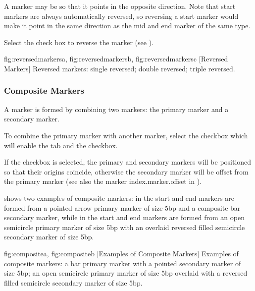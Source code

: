 A marker may be  so that it
points in the opposite direction. Note that start markers are always 
automatically reversed, so reversing a start marker would make it
point in the same direction as the mid and end marker of the same
type.


Select the  check box to reverse the marker
(see ).

{
  {fig:reversedmarkersa}{}{},
  {fig:reversedmarkersb}{}{},
  {fig:reversedmarkersc}{}{}
}
[Reversed Markers]
{Reversed markers:
 single reversed;
 double reversed;
 triple reversed.}

\subsubsection{Composite Markers}\label{sec:compositemarkers}

A  marker is formed by
combining two markers: the primary marker and a secondary marker.


To combine the primary marker with another marker, select the
 \gls{checkbox} which will enable the
 tab and the  checkbox.


If the  \gls*{checkbox}
is selected, the primary and secondary markers will be positioned so
that their origins coincide, otherwise the secondary marker will be
offset from the primary marker (see also the marker
\gls{index.marker.offset} in ). 

 shows two examples of composite markers:
in  the start and end markers are formed
from a pointed arrow primary marker of size 5\gls{bp} and a
composite bar secondary marker, while in 
the start and end markers are formed from an open semicircle primary
marker of size 5bp with an overlaid reversed filled semicircle
secondary marker of size 5bp.

{
 {fig:compositea}{}{},
 {fig:compositeb}{}{}
}
[Examples of Composite Markers]
{Examples of composite markers:
 a bar primary marker with a pointed secondary
marker of size 5bp;
 an open semicircle primary marker of
size 5bp overlaid with a reversed filled semicircle secondary marker
of size 5bp.}


